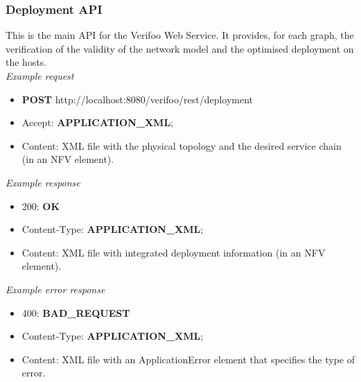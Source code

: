 \documentclass[a4paper,11pt]{article}
\begin{document}
\subsubsection*{Deployment API}
This is the main API for the Verifoo Web Service. It provides, for each graph, the verification of the validity of the network model and the optimised deployment on the hosts.\\
\textit{Example request}
\begin{itemize}
    \item \textbf{POST} http://localhost:8080/verifoo/rest/deployment
    \item Accept: \textbf{APPLICATION\_XML};
    \item Content: XML file with the physical topology and the desired service chain (in an NFV element).
\end{itemize}
\textit{Example response}
\begin{itemize}
    \item 200: \textbf{OK}
    \item Content-Type: \textbf{APPLICATION\_XML};
    \item Content: XML file with integrated deployment information (in an NFV element).
\end{itemize}
\textit{Example error response}
\begin{itemize}
    \item 400: \textbf{BAD\_REQUEST}
    \item Content-Type: \textbf{APPLICATION\_XML};
    \item Content: XML file with an ApplicationError element that specifies the type of error.
\end{itemize}
\end{document}
